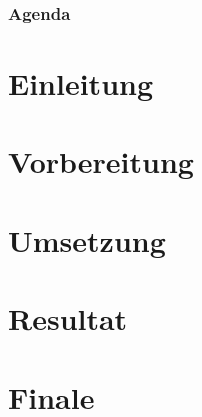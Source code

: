 \documentclass[hyperref={bookmarks=false},aspectratio=169]{beamer}
\begin{document}
\frame{\titlepage}  %

\begin{frame}
\frametitle{Agenda}
\tableofcontents
\end{frame}

\section{Einleitung}
	
	


\section{Vorbereitung}
	
	
	
	

\section{Umsetzung}
	
	
	
	


\section{Resultat}
	
	
	


\section{Finale}
	
\end{document}
